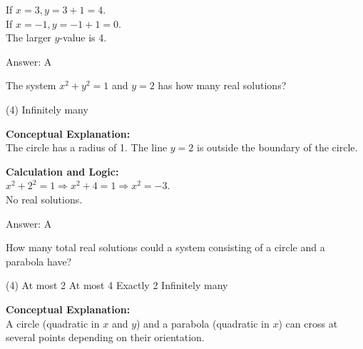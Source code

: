 \documentclass[11pt,paper=a4,answers]{exam}
\begin{document}
\begin{questions}
\begin{solution}
\vspace{10pt}

If $x = 3, y = 3 + 1 = 4$. \\
If $x = -1, y = -1 + 1 = 0$. \\
The larger $y$-value is 4.

\vspace{25pt}

Answer: \colorbox{yellow!100}{A}
\end{solution}

\vspace{40pt}

\question
The system $x^2 + y^2 = 1$ and $y = 2$ has how many real solutions?
\begin{tasks}(4)
    \task Infinitely many
\end{tasks}

\begin{solution}
\textbf{Conceptual Explanation:} \\
The circle has a radius of 1. The line $y = 2$ is outside the boundary of the circle.

\vspace{20pt}

\textbf{Calculation and Logic:} \\
$x^2 + 2^2 = 1 \Rightarrow x^2 + 4 = 1 \Rightarrow x^2 = -3$. \\
No real solutions.

\vspace{25pt}

Answer: \colorbox{yellow!100}{A}
\end{solution}

\vspace{40pt}

\question

How many total real solutions could a system consisting of a circle and a parabola have?
\begin{tasks}(4)
    \task At most 2
    \task At most 4
    \task Exactly 2
    \task Infinitely many
\end{tasks}

\begin{solution}
\textbf{Conceptual Explanation:} \\
A circle (quadratic in $x$ and $y$) and a parabola (quadratic in $x$) can cross at several points depending on their orientation.


\end{solution}
\end{questions}
\end{document}
